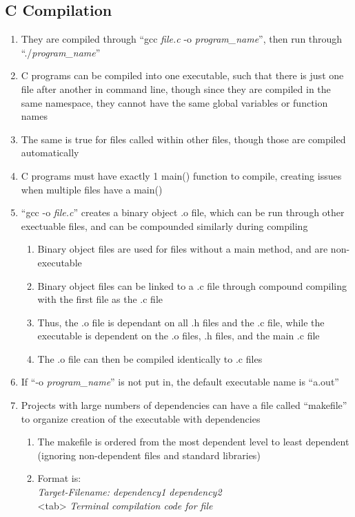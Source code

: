 \documentclass[11 pt, twoside]{article}
\begin{document}
\subsection{C Compilation}
\begin{enumerate}
\item They are compiled through ``gcc \textit{file.c} -o \textit{program\_name}'', then run through ``./\textit{program\_name}''
\item C programs can be compiled into one executable, such that there is just one file after another in command line, though since they are compiled in the same namespace, they cannot have the same global variables or function names
\item The same is true for files called within other files, though those are compiled automatically
\item C programs must have exactly 1 main() function to compile, creating issues when multiple files have a main()
\item ``gcc -o \textit{file.c}'' creates a binary object .o file, which can be run through other exectuable files, and can be compounded similarly during compiling
\begin{enumerate}
\item Binary object files are used for files without a main method, and are non-executable
\item Binary object files can be linked to a .c file through compound compiling with the first file as the .c file
\item Thus, the .o file is dependant on all .h files and the .c file, while the executable is dependent on the .o files, .h files, and the main .c file
\item The .o file can then be compiled identically to .c files
\end{enumerate}
\item If ``-o \textit{program\_name}'' is not put in, the default executable name is ``a.out''
\item Projects with large numbers of dependencies can have a file called ``makefile'' to organize creation of the executable with dependencies
\begin{enumerate}
\item The makefile is ordered from the most dependent level to least dependent (ignoring non-dependent files and standard libraries)
\item Format is: \\ \textit{Target-Filename: dependency1 dependency2}\\ <tab> \textit{Terminal compilation code for file}

\end{enumerate}
\end{enumerate}
\end{document}
